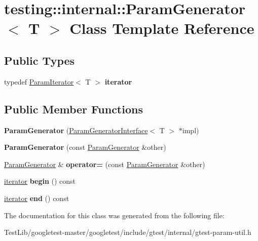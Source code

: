 \hypertarget{classtesting_1_1internal_1_1ParamGenerator}{}\section{testing\+:\+:internal\+:\+:Param\+Generator$<$ T $>$ Class Template Reference}
\label{classtesting_1_1internal_1_1ParamGenerator}
\subsection*{Public Types}
\begin{DoxyCompactItemize}
\item 
\mbox{\label{classtesting_1_1internal_1_1ParamGenerator_a448b08a8eaae1f1d27840d4dbd66c357}} 
typedef \hyperlink{classtesting_1_1internal_1_1ParamIterator}{Param\+Iterator}$<$ T $>$ {\bfseries iterator}
\end{DoxyCompactItemize}
\subsection*{Public Member Functions}
\begin{DoxyCompactItemize}
\item 
\mbox{\label{classtesting_1_1internal_1_1ParamGenerator_a6b017d4d030927714d495ee95ae92fbc}} 
{\bfseries Param\+Generator} (\hyperlink{classtesting_1_1internal_1_1ParamGeneratorInterface}{Param\+Generator\+Interface}$<$ T $>$ $\ast$impl)
\item 
\mbox{\label{classtesting_1_1internal_1_1ParamGenerator_a5891d25c31919b3099489f8bbcd58b5e}} 
{\bfseries Param\+Generator} (const \hyperlink{classtesting_1_1internal_1_1ParamGenerator}{Param\+Generator} \&other)
\item 
\mbox{\label{classtesting_1_1internal_1_1ParamGenerator_a590a03c6e0a3a3ac6279943ad1f01dc8}} 
\hyperlink{classtesting_1_1internal_1_1ParamGenerator}{Param\+Generator} \& {\bfseries operator=} (const \hyperlink{classtesting_1_1internal_1_1ParamGenerator}{Param\+Generator} \&other)
\item 
\mbox{\label{classtesting_1_1internal_1_1ParamGenerator_a14e735c8bd113556ae905a560cd2d607}} 
\hyperlink{classtesting_1_1internal_1_1ParamIterator}{iterator} {\bfseries begin} () const
\item 
\mbox{\label{classtesting_1_1internal_1_1ParamGenerator_aaf8f75df1099a07ff771a550b48f9fbe}} 
\hyperlink{classtesting_1_1internal_1_1ParamIterator}{iterator} {\bfseries end} () const
\end{DoxyCompactItemize}


The documentation for this class was generated from the following file\+:\begin{DoxyCompactItemize}
\item 
Test\+Lib/googletest-\/master/googletest/include/gtest/internal/gtest-\/param-\/util.\+h\end{DoxyCompactItemize}
